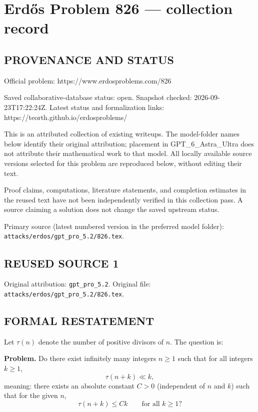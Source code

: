 \section*{Erd\H{o}s Problem 826 --- collection record}

\subsection*{PROVENANCE AND STATUS}
Official problem: https://www.erdosproblems.com/826

Saved collaborative-database status: open.
Snapshot checked: 2026-09-23T17:22:24Z.
Latest status and formalization links: https://teorth.github.io/erdosproblems/

This is an attributed collection of existing writeups. The model-folder names below identify their original attribution; placement in GPT\_6\_Astra\_Ultra does not attribute their mathematical work to that model. All locally available source versions selected for this problem are reproduced below, without editing their text.

Proof claims, computations, literature statements, and completion estimates in the reused text have not been independently verified in this collection pass. A source claiming a solution does not change the saved upstream status.

Primary source (latest numbered version in the preferred model folder): \texttt{attacks/erdos/gpt\_pro\_5.2/826.tex}.

\subsection*{REUSED SOURCE 1}
Original attribution: \texttt{gpt\_pro\_5.2}.
Original file: \texttt{attacks/erdos/gpt\_pro\_5.2/826.tex}.


\subsection*{FORMAL RESTATEMENT}
Let $\tau(n)$ denote the number of positive divisors of $n$. The question is:

\medskip
\noindent\textbf{Problem.} Do there exist infinitely many integers $n\ge 1$ such that for all integers $k\ge 1$,
\[
\tau(n+k) \ll k,
\]
meaning: there exists an absolute constant $C>0$ (independent of $n$ and $k$) such that for the given $n$,
\[
\tau(n+k)\le Ck\qquad\text{for all }k\ge 1?
\]

